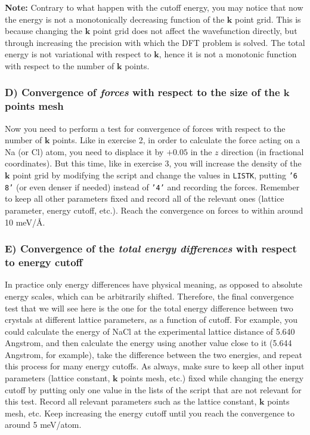 \documentclass[12pt]{article}
\begin{document}
{\bf Note:} Contrary to what happen with the cutoff energy, you may notice that now
the energy is not a monotonically decreasing function of the $\mathbf{k}$ point grid.
This is because changing the $\mathbf{k}$ point grid does not affect the wavefunction
directly, but through increasing the precision with which the DFT problem is solved.
The total energy is not variational with respect to $\mathbf{k}$, hence it is not a monotonic function with respect to the number of $\mathbf{k}$ points.

\vspace{6mm}
\subsubsection*{D) Convergence of {\it forces} with respect to the size of the
$\mathbf{k}$ points mesh}

Now you need to perform a test for convergence of forces with respect to the number of $\mathbf{k}$ points.
Like in exercise 2, in order to calculate the force acting on a Na (or Cl) atom, you need to displace it by $+0.05$ in the $z$ direction (in fractional coordinates).
But this time, like in exercise 3, you will increase the density of the $\mathbf{k}$
point grid by modifying the script and change the values in {\tt LISTK}, putting
{\tt '6 8'} (or even denser if needed) instead of {\tt '4'} and recording the forces.
Remember to keep all other parameters fixed and record all of the relevant ones
(lattice parameter, energy cutoff, etc.).
Reach the convergence on forces to within around 10 meV/\AA.

\vspace{6mm}
\subsubsection*{E) Convergence of the {\it total energy differences} with respect to energy cutoff}

In practice only energy differences have physical meaning, as opposed to absolute energy
scales, which can be arbitrarily shifted.
Therefore, the final convergence test that we will see here is the one for the total
energy difference between two crystals at different lattice parameters, as a function
of cutoff.
For example, you could calculate the energy of NaCl at the experimental lattice distance
of 5.640 Angstrom, and then calculate the energy using another value close to it (5.644 Angstrom, for example), take the difference between the two energies, and repeat this
process for many energy cutoffs.
As always, make sure to keep all other input parameters (lattice constant, $\mathbf{k}$
points mesh, etc.) fixed while changing the energy cutoff by putting only one value in
the lists of the script that are not relevant for this test.
Record all relevant parameters such as the lattice constant, $\mathbf{k}$ points mesh, etc.
Keep increasing the energy cutoff until you reach the convergence to around 5 meV/atom.
\end{document}
